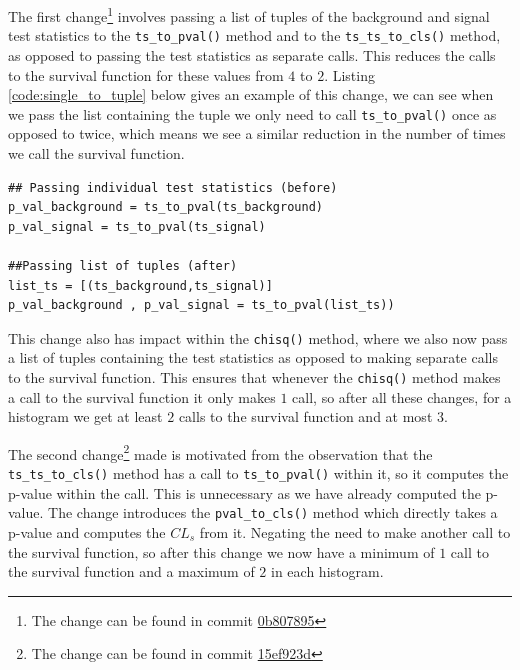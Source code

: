 The first change\footnote{The change can be found in commit \href{https://gitlab.com/hepcedar/contur/-/commit/0b80789580cd0529bfdce28d2bae252755c45a63}{0b807895}} involves passing a list of tuples of the background and signal test statistics to the \texttt{ts\_to\_pval()} method and to the \texttt{ts\_ts\_to\_cls()} method, as opposed to passing the test statistics as separate calls. This reduces the calls to the survival function for these values from $4$ to $2$. Listing \ref{code:single_to_tuple} below gives an example of this change, we can see when we pass the list containing the tuple we only need to call \texttt{ts\_to\_pval()} once as opposed to twice, which means we see a similar reduction in the number of times we call the survival function.
\begin{code}
\label{code:single_to_tuple}
\begin{verbatim}
## Passing individual test statistics (before)
p_val_background = ts_to_pval(ts_background)
p_val_signal = ts_to_pval(ts_signal)

##Passing list of tuples (after)
list_ts = [(ts_background,ts_signal)]
p_val_background , p_val_signal = ts_to_pval(list_ts))

\end{verbatim}
\end{code}
This change also has impact within the \texttt{chisq()} method, where we also now pass a list of tuples containing the test statistics as opposed to making separate calls to the survival function. This ensures that whenever the \texttt{chisq()}  method makes a call to the survival function it only makes $1$ call, so after all these changes, for a histogram we get at least $2$ calls to the survival function and at most $3$.

The second change\footnote{The change can be found in commit \href{https://gitlab.com/hepcedar/contur/-/commit/15ef923de401ced56f3186ed3bf6528c7d46f890}{15ef923d}} made is motivated from the observation that the \texttt{ts\_ts\_to\_cls()} method has a call to \texttt{ts\_to\_pval()} within it, so it computes the p-value within the call. This is unnecessary as we have already computed the p-value. The change introduces the \texttt{pval\_to\_cls()} method which directly takes a p-value and computes the $CL_s$ from it. Negating the need to make another call to the survival function, so after this change we now have a minimum of $1$ call to the survival function and a maximum of $2$ in each histogram.


